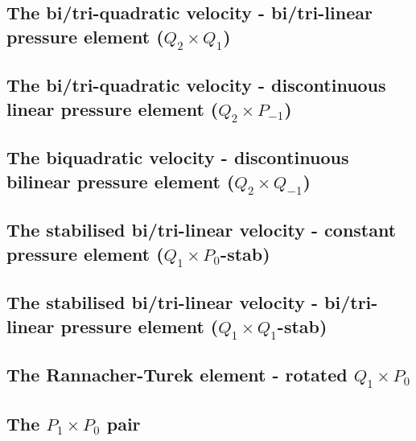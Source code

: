 \subsection{The bi/tri-quadratic velocity - bi/tri-linear pressure element ($Q_2 \times Q_1$)}
\label{ss:pairq2q1}


\subsection{The bi/tri-quadratic velocity - discontinuous linear pressure element ($Q_2 \times P_{-1}$)}
\label{ss:pairq2pm1}


\subsection{The biquadratic velocity - discontinuous bilinear pressure element ($Q_2 \times Q_{-1}$)}
\label{ss:pair_q2qm1}


\subsection{The stabilised bi/tri-linear velocity - constant pressure element ($Q_1\times P_0$-stab)}
\label{ss:pairq1p0stab}



\subsection{The stabilised bi/tri-linear velocity - bi/tri-linear pressure element ($Q_1\times Q_1$-stab)}
\label{ss:pairq1q1stab}



\subsection{The Rannacher-Turek element - rotated ${ Q}_1\times P_0$} \label{ss:RTq1p0}


\subsection{The ${ P}_1\times P_0$ pair} \label{ss:p1p0}



